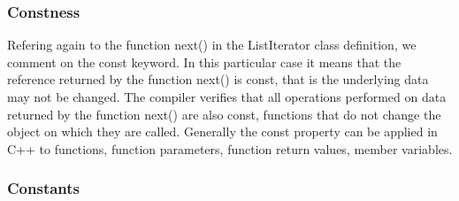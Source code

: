 \subsubsection {Constness}

Refering again to the function next() in the ListIterator class definition, we comment on the const keyword. In this particular case it means that the reference returned by the function next() is const, that is the underlying data may not be changed. The compiler verifies that all operations performed on data returned by the function next() are also const, functions that do not change the object on which they are called. Generally the const property can be applied in C++ to functions, function parameters, function return values, member variables. 
\subsubsection {Constants}